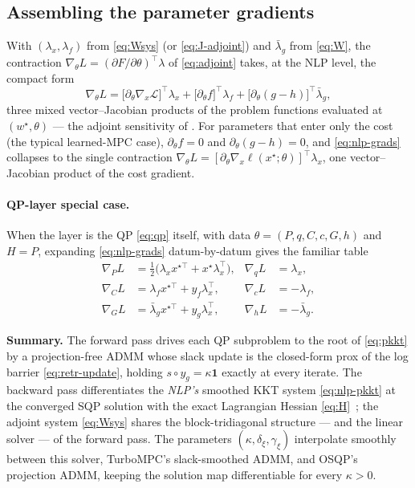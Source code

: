 \documentclass[10pt,twocolumn]{article}
\newcommand{\half}{\tfrac{1}{2}}
\newcommand{\ones}{\mathbf{1}}
\begin{document}
\subsection{Assembling the parameter gradients}
With $(\lambda_x,\lambda_f)$ from \eqref{eq:Wsys} (or \eqref{eq:J-adjoint}) and
$\bar\lambda_g$ from \eqref{eq:W}, the contraction
$\nabla_\theta L = (\partial F/\partial\theta)^\top\lambda$ of \eqref{eq:adjoint}
takes, at the NLP level, the compact form
\begin{equation}
\label{eq:nlp-grads}
\nabla_\theta L
= \bigl[\partial_\theta\nabla_x\mathcal L\bigr]^\top\lambda_x
+ \bigl[\partial_\theta f\bigr]^\top\lambda_f
+ \bigl[\partial_\theta (g - h)\bigr]^\top\bar\lambda_g ,
\end{equation}
three mixed vector--Jacobian products of the problem functions evaluated at
$(w^\star,\theta)$ --- the adjoint sensitivity of \cite[Eq.~(13)]{frey}. For
parameters that enter only the cost (the typical learned-MPC case),
$\partial_\theta f = 0$ and $\partial_\theta(g-h) = 0$, and \eqref{eq:nlp-grads}
collapses to the single contraction
$\nabla_\theta L = [\partial_\theta\nabla_x\ell(x^\star;\theta)]^\top\lambda_x$,
one vector--Jacobian product of the cost gradient.

\paragraph{QP-layer special case.} When the layer is the QP \eqref{eq:qp} itself,
with data $\theta = (P,q,C,c,G,h)$ and $H = P$, expanding \eqref{eq:nlp-grads}
datum-by-datum gives the familiar table
\begin{equation}
\label{eq:paramgrads}
\begin{aligned}
\nabla_P L &= \half\bigl(\lambda_x x^{\star\top} + x^\star\lambda_x^\top\bigr),
& \nabla_q L &= \lambda_x,\\
\nabla_C L &= \lambda_f x^{\star\top} + y_f\lambda_x^\top,
& \nabla_c L &= -\lambda_f,\\
\nabla_G L &= \bar\lambda_g x^{\star\top} + y_g\lambda_x^\top,
& \nabla_h L &= -\bar\lambda_g .
\end{aligned}
\end{equation}

\medskip
\noindent\textbf{Summary.} The forward pass drives each QP subproblem to the root
of \eqref{eq:pkkt} by a projection-free ADMM whose slack update is the closed-form
prox of the log barrier \eqref{eq:retr-update}, holding $s\circ y_g = \kappa\ones$
exactly at every iterate. The backward pass differentiates the \emph{NLP's}
smoothed KKT system \eqref{eq:nlp-pkkt} at the converged SQP solution with the
exact Lagrangian Hessian \eqref{eq:H}~\cite{frey}; the adjoint system
\eqref{eq:Wsys} shares the block-tridiagonal structure --- and the linear solver
--- of the forward pass. The parameters $(\kappa, \delta_\xi, \gamma_\xi)$
interpolate smoothly between this solver, TurboMPC's slack-smoothed ADMM, and
OSQP's projection ADMM, keeping the solution map differentiable for every
$\kappa > 0$.
\end{document}
